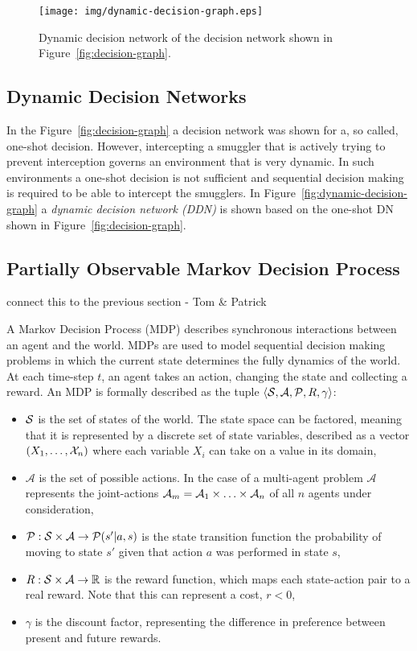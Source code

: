 \documentclass[conference]{IEEEtran}
\begin{document}
\begin{figure}[!t]
\begin{center}
 \texttt{[image: img/dynamic-decision-graph.eps]}
 \caption{Dynamic decision network of the decision network shown in Figure~\ref{fig:decision-graph}.}\label{fig:ddn} 
\end{center}
\end{figure}


\subsection{Dynamic Decision Networks}

In the Figure~\ref{fig:decision-graph} a decision network was shown for a, so called, one-shot decision. However, intercepting a smuggler that is actively trying to prevent interception governs an environment that is very dynamic. In such environments a one-shot decision is not sufficient and sequential decision making is required to be able to intercept the smugglers. In Figure~\ref{fig:dynamic-decision-graph} a {\em dynamic decision network (DDN)} is shown based on the one-shot DN shown in Figure~\ref{fig:decision-graph}.

\subsection{Partially Observable Markov Decision Process}
\label{sub:pomdp}
{\red connect this to the previous section - Tom \& Patrick}

A Markov Decision Process (MDP) \cite{bellman1957dynamic,mdp} describes synchronous interactions between an agent and the world. MDPs are used to model sequential decision making problems in which the current state determines the fully dynamics of the world. At each time-step $t$, an agent takes an action, changing the state and collecting a reward. An MDP is formally described as the tuple $\langle\S,\mathcal{A},\P,R,\gamma\rangle$:

\begin{itemize}
\item $\S$ is the set of states of the world. The state space can be factored, meaning that it is represented by a discrete set of state variables, described as a vector $\left(X_1,\ldots,\X_n\right)$ where each variable $X_i$ can take on a value in its domain,
\item $\mathcal{A}$ is the set of possible actions. In the case of a multi-agent problem $\mathcal{A}$ represents the joint-actions $\A_{m} = \A_1\times\ldots\times\A_n$ of all $n$ agents under consideration,
\item $\P:\S\times\mathcal{A}\to\P(s'|a,s)$ is the state transition function \ie the probability of moving to state $s'$ given that action $a$ was performed in state $s$,
\item $R:\S\times\mathcal{A}\to\mathbb{R}$ is the reward function, which maps each state-action pair to a real reward. Note that this can represent a cost, \ie $r < 0$,
\item $\gamma$ is the discount factor, representing the difference in preference between present and future rewards.
\end{itemize}
\end{document}
